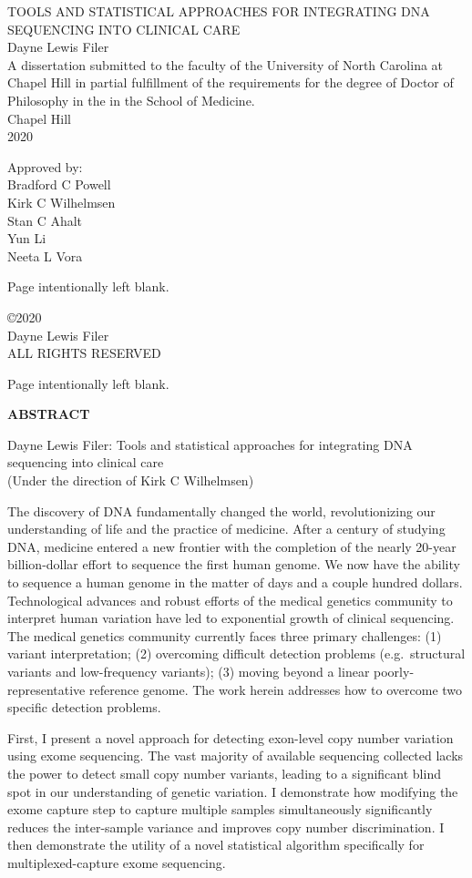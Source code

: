 \documentclass[11pt,letterpaper]{book}
\makeatletter
\renewcommand{\maketitle}{ 
	\singlespacing
	\thispagestyle{empty} 
	\begin{center}
	  \vspace*{0.8125in}
	  \Large{{\MakeUppercase{Tools and statistical approaches for integrating DNA sequencing into clinical care}}} \\ \vspace{1in} 
	  \normalsize 
  	Dayne Lewis Filer \\ \vspace{1in} 
  	A dissertation submitted to the faculty of the University of North Carolina at Chapel Hill in partial fulfillment of the requirements for the degree of Doctor of Philosophy in the  in the School of Medicine.
  	\vspace{1in}
  	\\ Chapel Hill \\ 2020 \\ 
	\end{center}
	\vspace{1in}
	\hfill
  \begin{minipage}{1.5in} 
      \raggedright
      \doublespacing
      Approved by:\\
              Bradford C Powell \\
              Kirk C Wilhelmsen \\
              Stan C Ahalt \\
              Yun Li \\
              Neeta L Vora \\
        \end{minipage}
}
\newcommand*{\blankpage}{%
\vspace*{\fill}
{\centering Page intentionally left blank. \par}
\vspace{\fill}}
\renewcommand*{\cleardoublepage}{\clearpage\if@twoside \ifodd\c@page\else
\blankpage
\thispagestyle{empty}
\newpage
\if@twocolumn\hbox{}\newpage\fi\fi\fi}
\newcommand{\mytwoin}[1]{
\vspace*{0.6875in}
\begin{center}
\bfseries\Large\MakeUppercase{#1}
\end{center}
}
\makeatother
\begin{document}
\frontmatter

  \maketitle

\pagestyle{plain}
\doublespacing

  \cleardoublepage
  \thispagestyle{empty}
  \vspace*{\fill}
  \begin{center}
    \singlespacing
    \copyright 2020 \\
    Dayne Lewis Filer \\
    ALL RIGHTS RESERVED
  \end{center}

  \cleardoublepage
  \mytwoin{abstract}
  \begin{center}
    \singlespacing
    Dayne Lewis Filer: Tools and statistical approaches for integrating DNA sequencing into clinical care \\ (Under the direction of Kirk C Wilhelmsen)
  \end{center}
  
  \doublespacing
  The discovery of DNA fundamentally changed the world, revolutionizing our understanding of life and the practice of medicine.
  After a century of studying DNA, medicine entered a new frontier with the completion of the nearly 20-year billion-dollar effort to sequence the first human genome.
  We now have the ability to sequence a human genome in the matter of days and a couple hundred dollars.
  Technological advances and robust efforts of the medical genetics community to interpret human variation have led to exponential growth of clinical sequencing.
  The medical genetics community currently faces three primary challenges: (1) variant interpretation; (2) overcoming difficult detection problems (e.g.~structural variants and low-frequency variants); (3) moving beyond a linear poorly-representative reference genome.
  The work herein addresses how to overcome two specific detection problems.
  
  First, I present a novel approach for detecting exon-level copy number variation using exome sequencing.
  The vast majority of available sequencing collected lacks the power to detect small copy number variants, leading to a significant blind spot in our understanding of genetic variation.
  I demonstrate how modifying the exome capture step to capture multiple samples simultaneously significantly reduces the inter-sample variance and improves copy number discrimination.
  I then demonstrate the utility of a novel statistical algorithm specifically for multiplexed-capture exome sequencing.
  
\end{document}
